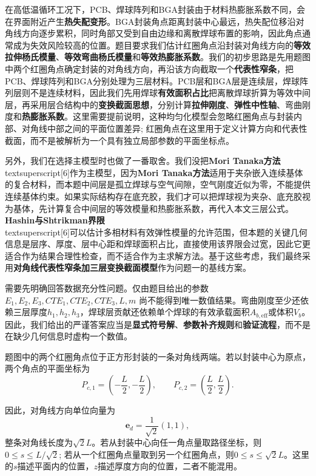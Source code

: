 \documentclass[draft,12pt,a4paper]{ctexart}
\theoremstyle{definition}
\begin{document}
在高低温循环工况下，PCB、焊球阵列和BGA封装由于材料热膨胀系数不同，会在界面附近产生\textbf{热失配变形}。BGA封装角点距离封装中心最远，热失配位移沿对角线方向逐步累积，同时角部又受到自由边缘和离散焊球布置的影响，因此角点通常成为失效风险较高的位置。题目要求我们估计红圈角点沿封装对角线方向的\textbf{等效拉伸杨氏模量}、\textbf{等效弯曲杨氏模量}和\textbf{等效热膨胀系数}。我们的初步思路是先用题图中两个红圈角点确定封装的对角线方向，再沿该方向截取一个\textbf{代表性窄条}，把PCB、焊球阵列和BGA分别处理为三层材料。PCB层和BGA层是连续层，焊球阵列层则不是连续材料，因此我们先用焊球\textbf{有效面积占比}把离散焊球折算为等效中间层，再采用层合结构中的\textbf{变换截面思想}，分别计算\textbf{拉伸刚度}、\textbf{弹性中性轴}、弯曲刚度和\textbf{热膨胀系数}。这里需要提前说明，这种均匀化模型会忽略红圈角点与封装内部、对角线中部之间的平面位置差异; 红圈角点在这里用于定义计算方向和代表性截面，而不是被解析为一个具有独立局部参数的平面坐标点。

另外，我们在选择主模型时也做了一番取舍。我们没把\textbf{Mori Tanaka方法}\\textsuperscript{[6]}作为主模型，因为\textbf{Mori Tanaka方法}适用于夹杂嵌入连续基体的复合材料，而本题中间层是孤立焊球与空气间隙，空气刚度近似为零，不能提供连续基体约束。如果实际结构存在底充胶，我们才可以把焊球视为夹杂、底充胶视为基体，先计算复合中间层的等效模量和热膨胀系数，再代入本文三层公式。\textbf{Hashin与Shtrikman界限}\\textsuperscript{[6]}可以估计多相材料有效弹性模量的允许范围，但本题的关键几何信息是层序、厚度、层中心距和焊球面积占比，直接使用该界限会过宽，因此它更适合作为结果合理性检查，而不适合作为主求解方法。基于这些考虑，我们最终采用\textbf{对角线代表性窄条加三层变换截面模型}作为问题一的基线方案。

需要先明确回答数据充分性问题。仅由题目给出的参数
$E_1,E_2,E_3,\allowbreak CTE_1,CTE_2,\allowbreak CTE_3,L,m$
尚不能得到唯一数值结果。弯曲刚度至少还依赖三层厚度$h_1,h_2,h_3$，焊球层贡献还依赖单个焊球的有效承载面积$A_{b,\mathrm{eff}}$或体积$V_b$。因此，我们给出的严谨答案应当是\textbf{显式符号解}、\textbf{参数补齐规则}和\textbf{验证流程}，而不是在缺少几何信息时虚构一个数值。


题图中的两个红圈角点位于正方形封装的一条对角线两端。若以封装中心为原点，两个角点的平面坐标为
\begin{equation}
P_{c,1}=\left(-\frac{L}{2},-\frac{L}{2}\right),\qquad
P_{c,2}=\left(\frac{L}{2},\frac{L}{2}\right).
\end{equation}

因此，对角线方向单位向量为
\begin{equation}
\mathbf{e}_d=\frac{1}{\sqrt{2}}(1,1),
\end{equation}
整条对角线长度为$\sqrt{2}L$。若从封装中心向任一角点量取路径坐标，则$0 \leq s \leq L/\sqrt{2}$; 若从一个红圈角点量取到另一个红圈角点，则$0 \leq s \leq \sqrt{2}L$。这里的$s$描述平面内的位置，$z$描述厚度方向的位置，二者不能混用。
\end{document}
